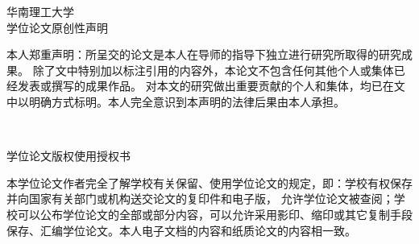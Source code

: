 \thispagestyle{empty}

\begin{center}
    \vspace{0.5\baselineskip}
    {\heiti {} 华南理工大学} \\
    \vspace{0.5\baselineskip}
    {\heiti {} 学位论文原创性声明}
    \vspace{0.5\baselineskip}
\end{center}

\begin{spacing}{1.7}
    \songti {}
    本人郑重声明：所呈交的论文是本人在导师的指导下独立进行研究所取得的研究成果。
    除了文中特别加以标注引用的内容外，本论文不包含任何其他个人或集体已经发表或撰写的成果作品。
    对本文的研究做出重要贡献的个人和集体，均已在文中以明确方式标明。本人完全意识到本声明的法律后果由本人承担。 
    \begin{center}
          \\
    \end{center}
\end{spacing}

\begin{center}
    \vspace{0.5\baselineskip}
    {\heiti {} 学位论文版权使用授权书} \\
    \vspace{0.5\baselineskip}
\end{center}

\begin{spacing}{1.7}
    \songti {}
    本学位论文作者完全了解学校有关保留、使用学位论文的规定，即：学校有权保存并向国家有关部门或机构送交论文的复印件和电子版，
    允许学位论文被查阅；学校可以公布学位论文的全部或部分内容，可以允许采用影印、缩印或其它复制手段保存、汇编学位论文。本人电子文档的内容和纸质论文的内容相一致。 
    \begin{center}
          \\
          \\
          \\
    \end{center}
\end{spacing}

\newpage
